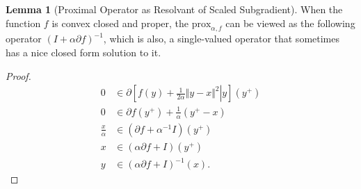 \documentclass[]{article}
\theoremstyle{definition}
\newtheorem{lemma}{Lemma}[subsection]  %
\begin{document}
        \begin{lemma}[Proximal Operator as Resolvant of Scaled Subgradient]\label{lemma:prox_alternative_form}
            When the function $f$ is convex closed and proper, the $\text{prox}_{\alpha, f}$ can be viewed as the following operator $(I + \alpha \partial f)^{-1}$, which is also, a single-valued operator that sometimes has a nice closed form solution to it.
        \end{lemma}
        \begin{proof}
            \begin{align*}
                0 &\in \partial
                \left[
                    \left.
                        f(y) + \frac{1}{2\alpha} \Vert y - x\Vert^2 
                    \right| y
                \right](y^+)
                \\
                0 &\in \partial f(y^+) + \frac{1}{\alpha}(y^+ - x)
                \\
                \frac{x}{\alpha} &\in 
                (\partial f + \alpha^{-1}I)(y^+)
                \\
                x &\in 
                (\alpha \partial f + I)(y^+)
                \\
                y &\in (\alpha\partial f+ I)^{-1}(x).
            \end{align*}
        \end{proof}
\end{document}
